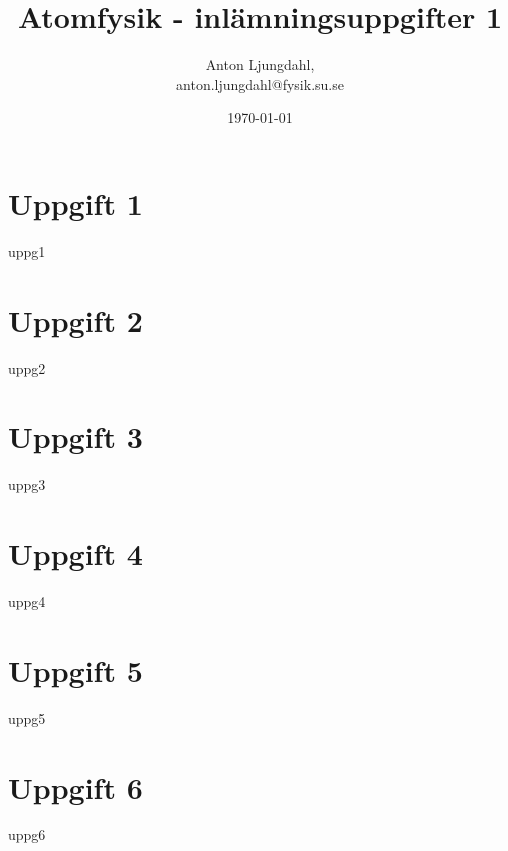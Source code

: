 \documentclass[12pt,a4paper]{article}
\numberwithin{equation}{section}
\begin{document}
\author{Anton Ljungdahl, \\
\small{anton.ljungdahl@fysik.su.se}}
\title{Atomfysik - inlämningsuppgifter 1}
\date{\today}
\maketitle

\section{   Uppgift 1}
{uppg1}

\section{   Uppgift 2}
{uppg2}

\section{   Uppgift 3}
{uppg3}

\section{   Uppgift 4}
{uppg4}

\section{   Uppgift 5}
{uppg5}

\section{   Uppgift 6}
{uppg6}
\end{document}
